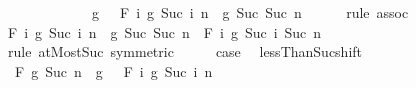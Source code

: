 \begin{isabellebody}
\ \ \ \ \ \ \ \ \ \ \ \ \ g\ {}\ \isactrlbold {\isacharasterisk}{\kern0pt}\ {\isacharparenleft}{\kern0pt}F\ {\isacharparenleft}{\kern0pt}{\isasymlambda}i{\isachardot}{\kern0pt}\ g\ {\isacharparenleft}{\kern0pt}Suc\ i{\isacharparenright}{\kern0pt}{\isacharparenright}{\kern0pt}\ {\isacharbraceleft}{\kern0pt}{\isachardot}{\kern0pt}{\isachardot}{\kern0pt}n{\isacharbraceright}{\kern0pt}\ \isactrlbold {\isacharasterisk}{\kern0pt}\ g\ {\isacharparenleft}{\kern0pt}Suc\ {\isacharparenleft}{\kern0pt}Suc\ n{\isacharparenright}{\kern0pt}{\isacharparenright}{\kern0pt}{\isacharparenright}{\kern0pt}{\isachardoublequoteclose}\isanewline
\ \ \ \ \isamarkupfalse%
\ {\isacharparenleft}{\kern0pt}rule\ assoc{\isacharparenright}{\kern0pt}\isanewline
\ \ \isamarkupfalse%
\ \isamarkupfalse%
\ {\isachardoublequoteopen}F\ {\isacharparenleft}{\kern0pt}{\isasymlambda}i{\isachardot}{\kern0pt}\ g\ {\isacharparenleft}{\kern0pt}Suc\ i{\isacharparenright}{\kern0pt}{\isacharparenright}{\kern0pt}\ {\isacharbraceleft}{\kern0pt}{\isachardot}{\kern0pt}{\isachardot}{\kern0pt}n{\isacharbraceright}{\kern0pt}\ \isactrlbold {\isacharasterisk}{\kern0pt}\ g\ {\isacharparenleft}{\kern0pt}Suc\ {\isacharparenleft}{\kern0pt}Suc\ n{\isacharparenright}{\kern0pt}{\isacharparenright}{\kern0pt}\ {\isacharequal}{\kern0pt}\ F\ {\isacharparenleft}{\kern0pt}{\isasymlambda}i{\isachardot}{\kern0pt}\ g\ {\isacharparenleft}{\kern0pt}Suc\ i{\isacharparenright}{\kern0pt}{\isacharparenright}{\kern0pt}\ {\isacharbraceleft}{\kern0pt}{\isachardot}{\kern0pt}{\isachardot}{\kern0pt}Suc\ n{\isacharbraceright}{\kern0pt}{\isachardoublequoteclose}\isanewline
\ \ \ \ \isamarkupfalse%
\ {\isacharparenleft}{\kern0pt}rule\ atMost{\isacharunderscore}{\kern0pt}Suc\ {\isacharbrackleft}{\kern0pt}symmetric{\isacharbrackright}{\kern0pt}{\isacharparenright}{\kern0pt}\isanewline
\ \ \isamarkupfalse%
\ \isamarkupfalse%
\ {\isacharquery}{\kern0pt}case\ \isacommand{{\isachardot}{\kern0pt}}\isamarkupfalse%
\isanewline
{}\isamarkupfalse%
%
\endisatagproof
{\isafoldproof}%
%
\isadelimproof
\isanewline
%
\endisadelimproof
\isanewline
{}\isamarkupfalse%
\ lessThan{\isacharunderscore}{\kern0pt}Suc{\isacharunderscore}{\kern0pt}shift{\isacharcolon}{\kern0pt}\isanewline
\ \ {\isachardoublequoteopen}F\ g\ {\isacharbraceleft}{\kern0pt}{\isachardot}{\kern0pt}{\isachardot}{\kern0pt}{\isacharless}{\kern0pt}Suc\ n{\isacharbraceright}{\kern0pt}\ {\isacharequal}{\kern0pt}\ g\ {}\ \isactrlbold {\isacharasterisk}{\kern0pt}\ F\ {\isacharparenleft}{\kern0pt}{\isasymlambda}i{\isachardot}{\kern0pt}\ g\ {\isacharparenleft}{\kern0pt}Suc\ i{\isacharparenright}{\kern0pt}{\isacharparenright}{\kern0pt}\ {\isacharbraceleft}{\kern0pt}{\isachardot}{\kern0pt}{\isachardot}{\kern0pt}{\isacharless}{\kern0pt}n{\isacharbraceright}{\kern0pt}{\isachardoublequoteclose}\isanewline

\end{isabellebody}
